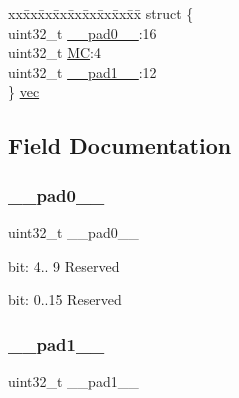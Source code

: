 \begin{DoxyCompactItemize}
\begin{tabbing}
\end{tabbing}\item 
\begin{tabbing}
xx\=xx\=xx\=xx\=xx\=xx\=xx\=xx\=xx\=\kill
struct \{\\
\>uint32\_t \mbox{\hyperlink{union_t_c_c___i_n_t_e_n_c_l_r___type_a3e57c2ef1c3ffb36722f000cc1156824}{\_\_pad0\_\_}}:16\\
\>uint32\_t \mbox{\hyperlink{union_t_c_c___i_n_t_e_n_c_l_r___type_a99b527974739f53477a2c1bca4970331}{MC}}:4\\
\>uint32\_t \mbox{\hyperlink{union_t_c_c___i_n_t_e_n_c_l_r___type_a6712ba6dd1d5b43d2d56ff8ac4e275a7}{\_\_pad1\_\_}}:12\\
\} \mbox{\hyperlink{union_t_c_c___i_n_t_e_n_c_l_r___type_a8bcbae4f39c1829ceb6d98589d329d27}{vec}}\\

\end{tabbing}\end{DoxyCompactItemize}


\subsection{Field Documentation}
\mbox{\label{union_t_c_c___i_n_t_e_n_c_l_r___type_a3e57c2ef1c3ffb36722f000cc1156824}} 
\subsubsection{\texorpdfstring{\_\_pad0\_\_}{\_\_pad0\_\_}}
{\footnotesize\ttfamily uint32\+\_\+t \+\_\+\+\_\+pad0\+\_\+\+\_\+}

bit\+: 4.. 9 Reserved

bit\+: 0..15 Reserved \mbox{\label{union_t_c_c___i_n_t_e_n_c_l_r___type_a6712ba6dd1d5b43d2d56ff8ac4e275a7}} 
\subsubsection{\texorpdfstring{\_\_pad1\_\_}{\_\_pad1\_\_}}
{\footnotesize\ttfamily uint32\+\_\+t \+\_\+\+\_\+pad1\+\_\+\+\_\+}

